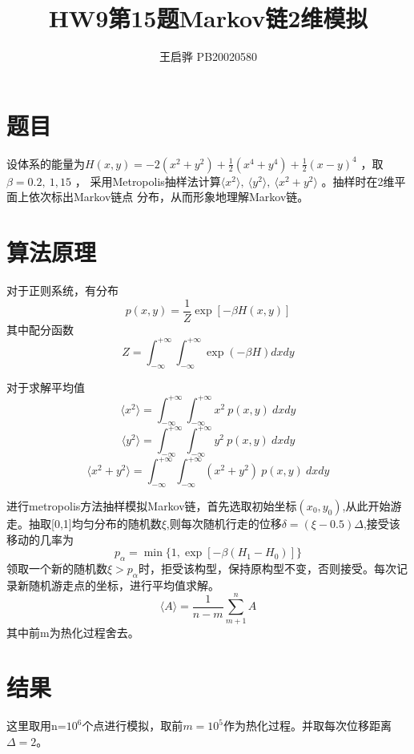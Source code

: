 \documentclass{article}
\title{\songti \zihao{2}\bfseries HW9第15题Markov链2维模拟}
\author{王启骅 PB20020580}
\begin{document}
	\maketitle
	\section{题目}
	设体系的能量为$ H(x,y)=-2(x^2+y^2)+\frac{1}{2}(x^4+y^4)+\frac{1}{2}(x-y)^4 $ ，取$\beta=0.2,\ 1,1 5$ ，
	采用Metropolis抽样法计算$ \langle x^2\rangle,\ \langle y^2\rangle,\ \langle x^2+y^2\rangle $ 。抽样时在2维平面上依次标出Markov链点
	分布，从而形象地理解Markov链。
	\section{算法原理}
	对于正则系统，有分布
	\begin{equation}
		p(x,y)=\frac{1}{Z}\exp[-\beta H(x,y)]
	\end{equation}
其中配分函数
\begin{equation}
	Z=\int_{-\infty}^{+\infty}\int_{-\infty}^{+\infty}\exp(-\beta H)dxdy
\end{equation}


对于求解平均值
\begin{equation}
	\langle x^2\rangle=\int_{-\infty}^{+\infty}\int_{-\infty}^{+\infty}x^2\ p(x,y)\ dxdy
\end{equation}
\begin{equation}
	\langle y^2\rangle=\int_{-\infty}^{+\infty}\int_{-\infty}^{+\infty}y^2\ p(x,y)\ dxdy
\end{equation}
\begin{equation}
	\langle x^2+y^2\rangle=\int_{-\infty}^{+\infty}\int_{-\infty}^{+\infty}(x^2+y^2)\ p(x,y)\ dxdy
\end{equation}


进行metropolis方法抽样模拟Markov链，首先选取初始坐标$ (x_0,y_0) $,从此开始游走。抽取[0,1]均匀分布的随机数$ \xi $,则每次随机行走的位移$ \delta=(\xi-0.5)\Delta $,接受该移动的几率为
\begin{equation}
	p_{\alpha}=\min\{1,\exp[-\beta(H_1-H_0)]\}
\end{equation}
领取一个新的随机数$ \xi>p_{\alpha} $时，拒受该构型，保持原构型不变，否则接受。每次记录新随机游走点的坐标，进行平均值求解。
\begin{equation}
	\langle A\rangle=\frac{1}{n-m}\sum_{m+1}^{n}A
\end{equation}
其中前m为热化过程舍去。
	\section{结果}
	这里取用n=$ 10^6 $个点进行模拟，取前$ m=10^5 $作为热化过程。并取每次位移距离$ \Delta=2 $。
\end{document}
